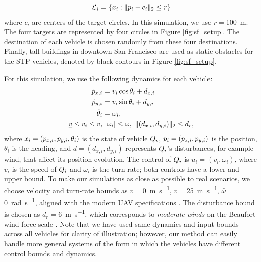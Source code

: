 \begin{equation}
\label{eq:target_sim}
\targetset_i = \{\state_i: \|\pos_i - c_i\|_2 \le r\}
\end{equation}
\noindent where $c_i$ are centers of the target circles. In this simulation, we use $r = $\SI{100}{\m}. The four targets are represented by four circles in Figure \ref{fig:sf_setup}. The destination of each vehicle is chosen randomly from these four destinations. Finally, tall buildings in downtown San Francisco are used as static obstacles for the STP vehicles, denoted by black contours in Figure \ref{fig:sf_setup}.

For this simulation, we use the following dynamics for each vehicle:
\begin{equation}
\label{eq:dyn_i}
\begin{aligned}
\dot{\pos}_{x,i} &= v_i \cos \theta_i + d_{x,i} \\
\dot{\pos}_{y,i} &= v_i \sin \theta_i + d_{y,i}\\
\dot{\theta}_i &= \omega_i, \\
\underline{v} \le v_i \le \bar{v}, & ~|\omega_i| \le \bar{\omega}, ~\|(d_{x,i}, d_{y,i}) \|_2 \le d_{r},
\end{aligned}
\end{equation}
\noindent where $x_i = (p_{x,i}, p_{y,i}, \theta_i)$ is the state of vehicle $Q_i$, $p_i = (p_{x,i}, p_{y,i})$ is the position, $\theta_i$ is the heading, and $d = (d_{x,i}, d_{y,i})$ represents $Q_i$'s disturbances, for example wind, that affect its position evolution. The control of $Q_i$ is $u_i = (v_i, \omega_i)$, where $v_i$ is the speed of $Q_i$ and $\omega_i$ is the turn rate; both controls have a lower and upper bound. To make our simulations as close as possible to real scenarios, we choose velocity and turn-rate bounds as $\underline{v} = $\SI{0}{\m\per\s}, $\bar{v} = $\SI{25}{\m\per\s}, $\bar\omega = $\SI{0}{\radian\per\s}, aligned with the modern UAV specifications \cite{UAVspecs1, UAVspecs2}. The disturbance bound is chosen as $d_{r} = $\SI{6}{\m\per\s}, which corresponds to \textit{moderate winds} on the Beaufort wind force scale \cite{Windscale}. Note that we have used same dynamics and input bounds across all vehicles for clarity of illustration; however, our method can easily handle more general systems of the form in which the vehicles have different control bounds and dynamics.

